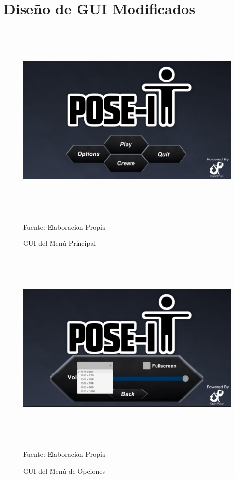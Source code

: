 \clearpage


\clearpage
\section{Diseño de GUI Modificados}



\begin{figure}[h!]
	\centering
	\includegraphics[width=16cm,height=10cm]{./Images/menuprincipal2.png}
	\caption{GUI del Menú Principal}
	\footnotesize Fuente: Elaboración Propia
	\label{gui1}
\end{figure}

\begin{figure}[h]
	\centering
	\includegraphics[width=16cm,height=10cm]{./Images/menuopciones2.png}
	\caption{GUI del Menú de Opciones}
	\footnotesize Fuente: Elaboración Propia
	\label{gui2}
\end{figure}

